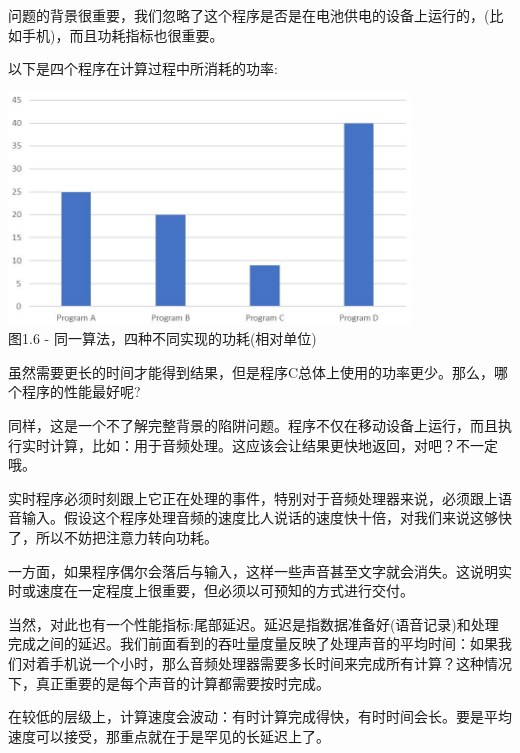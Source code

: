 问题的背景很重要，我们忽略了这个程序是否是在电池供电的设备上运行的，(比如手机)，而且功耗指标也很重要。


以下是四个程序在计算过程中所消耗的功率:

\begin{center}
\includegraphics[width=0.8\textwidth]{content/1/chapter1/images/6.jpg}\\
图1.6 - 同一算法，四种不同实现的功耗(相对单位)
\end{center}

虽然需要更长的时间才能得到结果，但是程序C总体上使用的功率更少。那么，哪个程序的性能最好呢?

同样，这是一个不了解完整背景的陷阱问题。程序不仅在移动设备上运行，而且执行实时计算，比如：用于音频处理。这应该会让结果更快地返回，对吧？不一定哦。


实时程序必须时刻跟上它正在处理的事件，特别对于音频处理器来说，必须跟上语音输入。假设这个程序处理音频的速度比人说话的速度快十倍，对我们来说这够快了，所以不妨把注意力转向功耗。

一方面，如果程序偶尔会落后与输入，这样一些声音甚至文字就会消失。这说明实时或速度在一定程度上很重要，但必须以可预知的方式进行交付。

当然，对此也有一个性能指标:尾部延迟。延迟是指数据准备好(语音记录)和处理完成之间的延迟。我们前面看到的吞吐量度量反映了处理声音的平均时间：如果我们对着手机说一个小时，那么音频处理器需要多长时间来完成所有计算？这种情况下，真正重要的是每个声音的计算都需要按时完成。

在较低的层级上，计算速度会波动：有时计算完成得快，有时时间会长。要是平均速度可以接受，那重点就在于是罕见的长延迟上了。

